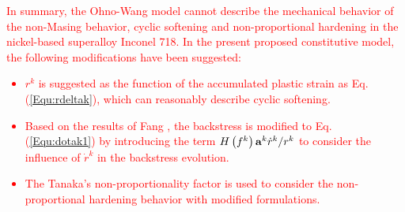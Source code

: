 \documentclass[preprint,5p,twocolumn,11pt,sort&compress]{elsarticle}
\newcommand{\bfa}{{\bf a}}
\newcommand{\marked}[1]{\textcolor{red}{#1}}
\begin{document}
\marked{In summary, the Ohno-Wang model cannot describe the mechanical behavior of the non-Masing behavior, cyclic softening and non-proportional hardening in the nickel-based superalloy Inconel 718. In the present proposed constitutive model, the following modifications have been suggested:
\begin{itemize} 
\item $r^k$ is suggested as the function of the accumulated plastic strain as Eq. (\ref{Equ:rdeltak}), which can reasonably describe cyclic softening. 
\item Based on the results of Fang \cite{fang2015cyclic}, the backstress is modified to Eq. (\ref{Equ:dotak1}) by introducing the term $H\left( {f^k} \right){\bfa^k}{\dot r^k}/{ r^k}$  to consider the influence of ${\dot r^k}$ in the backstress evolution. 
\item The Tanaka's non-proportionality factor is used to consider the non-proportional hardening behavior with modified formulations.
\end{itemize}}
\end{document}
